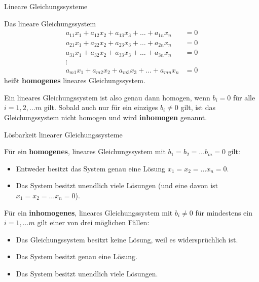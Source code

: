 \begin{frame}{Lineare Gleichungssysteme}
	\begin{definition}
	Das lineare Gleichungssystem
	\begin{align*}
	a_{11} x_{1} + a_{12} x_{2} + a_{13} x_{3} + \ldots + a_{1n} x_{n}  & =   0 \\
	a_{21} x_{1} + a_{22} x_{2} + a_{23} x_{3} + \ldots + a_{2n} x_{n}  & =   0 \\
	a_{31} x_{1} + a_{32} x_{2} + a_{33} x_{3} + \ldots + a_{3n} x_{n}  & =   0 \\
	\vdots \qquad &  \\
	a_{m1} x_{1} + a_{m2} x_{2} + a_{m3} x_{3} + \ldots + a_{mn} x_{n}  & =   0
	\end{align*}
	heißt \textbf{homogenes} lineares Gleichungssystem.
	\end{definition}
	\begin{bemerkung}
		Ein lineares Gleichungssystem ist also genau dann homogen, wenn $b_i = 0$ für alle $i=1, 2, \ldots m$ gilt.
		Sobald auch nur für ein einziges $b_i \neq 0$ gilt, ist das Gleichungssystem nicht homogen und wird \textbf{inhomogen} genannt.
	\end{bemerkung}
\end{frame}

\begin{frame}{Lösbarkeit linearer Gleichungssysteme}
	\begin{bemerkung}
		Für ein \textbf{homogenes}, lineares Gleichungssystem mit $b_1 = b_2 = \ldots b_m = 0$ gilt:
		\begin{itemize}
			\item Entweder besitzt das System genau eine Lösung $x_1 = x_2 = \ldots x_n = 0$.
			\item Das System besitzt unendlich viele Lösungen (und eine davon ist $x_1 = x_2 = \ldots x_n = 0$).
		\end{itemize}
	\end{bemerkung}
	\begin{bemerkung}
		Für ein \textbf{inhomogenes}, lineares Gleichungssystem mit $b_i \neq 0$ für mindestens ein $i=1, \ldots m$ gilt einer von drei möglichen Fällen:
		\begin{itemize}
			\item Das Gleichungssystem besitzt keine Lösung, weil es widersprüchlich ist.
			\item Das System besitzt genau eine Lösung.
			\item Das System besitzt unendlich viele Lösungen.
		\end{itemize}
	\end{bemerkung}
\end{frame}

